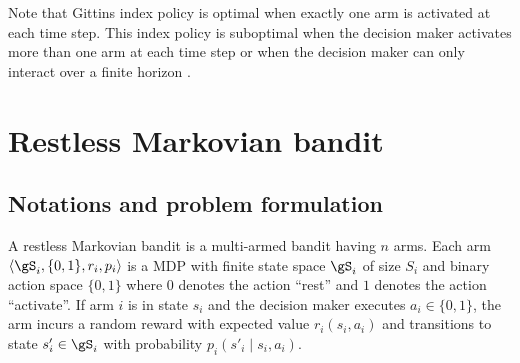 Note that Gittins index policy is optimal when exactly one arm is activated at each time step.
This index policy is suboptimal when the decision maker activates more than one arm at each time step or when the decision maker can only interact over a finite horizon \cite{gittins2011multi}.


\section{Restless Markovian bandit}
\label{ch:mb:sec:restless}



\subsection{Notations and problem formulation}
\label{ssec:restless_formul}

A restless Markovian bandit is a multi-armed bandit having $n$ arms.
Each arm $\langle\gS_i, \{0,1\}, r_i, p_i\rangle$ is a MDP with finite state space $\gS_i$ of size $S_i$ and binary action space $\{0,1\}$ where $0$ denotes the action ``rest'' and $1$ denotes the action ``activate''.
If arm $i$ is in state $s_i$ and the decision maker executes $a_i\in\{0,1\}$, the arm incurs a random reward with expected value $r_i(s_i,a_i)$ and transitions to state $s'_i\in\gS_i$ with probability $p_i(s'_i\mid s_i,a_i)$.

